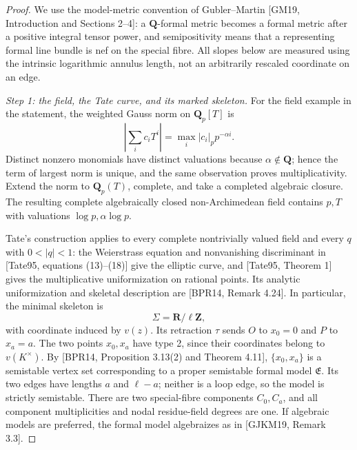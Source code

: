 \begin{proof}
We use the model-metric convention of Gubler--Martin [GM19,
Introduction and Sections 2--4]: a \(\mathbf Q\)-formal metric becomes a
formal metric after a positive integral tensor power, and semipositivity
means that a representing formal line bundle is nef on the special fibre.
All slopes below are measured using the intrinsic logarithmic annulus
length, not an arbitrarily rescaled coordinate on an edge.

\emph{Step 1: the field, the Tate curve, and its marked skeleton.}
For the field example in the statement, the weighted Gauss norm on
\(\mathbf Q_p[T]\) is
\[
 \left|\sum_i c_iT^i\right|
   =\max_i |c_i|_p p^{-\alpha i}.
\]
Distinct nonzero monomials have distinct valuations because
\(\alpha\notin\mathbf Q\); hence the term of largest norm is unique,
and the same observation proves multiplicativity. Extend the norm to
\(\mathbf Q_p(T)\), complete, and take a completed algebraic closure.
The resulting complete algebraically closed non-Archimedean field
contains \(p,T\) with valuations \(\log p,\alpha\log p\).

Tate's construction applies to every complete nontrivially valued field
and every \(q\) with \(0<|q|<1\): the Weierstrass equation and
nonvanishing discriminant in [Tate95, equations (13)--(18)] give the
elliptic curve, and [Tate95, Theorem 1] gives the multiplicative
uniformization on rational points. Its analytic uniformization and
skeletal description are [BPR14, Remark 4.24]. In particular, the minimal
skeleton is
\[
 \Sigma=\mathbf R/\ell\mathbf Z,
\]
with coordinate induced by \(v(z)\). Its retraction \(\tau\) sends
\(O\) to \(x_0=0\) and \(P\) to \(x_a=a\).
The two points \(x_0,x_a\) have type 2, since their coordinates belong
to \(v(K^\times)\). By [BPR14, Proposition 3.13(2) and Theorem 4.11],
\(\{x_0,x_a\}\) is a semistable vertex set corresponding to a proper
semistable formal model \(\mathfrak E\). Its two edges have lengths
\(a\) and \(\ell-a\); neither is a loop edge, so the model is strictly
semistable. There are two special-fibre components \(C_0,C_a\), and
all component multiplicities and nodal residue-field degrees are one.
If algebraic models are preferred, the formal model algebraizes as in
[GJKM19, Remark 3.3].


\end{proof}
